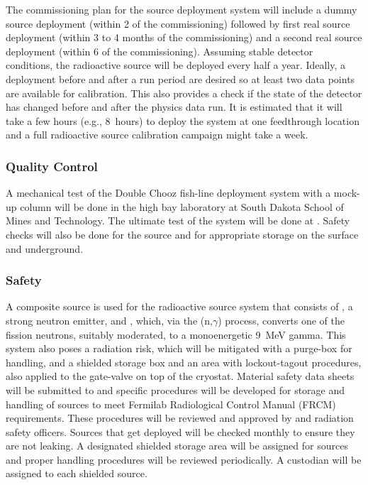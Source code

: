 The commissioning plan for the source deployment system will include a dummy source deployment (within \num{2} of the commissioning) followed by first real source deployment (within \num{3} to \num{4} months of the commissioning) and a second real source deployment (within \num{6} of the commissioning). Assuming stable detector conditions, the radioactive source will be deployed every half a year. Ideally, a deployment before and after a run period are desired so at least two data points are available for calibration. This also provides a check if the state of the detector
has changed before and after the physics data run.
It is estimated that it will take a few hours (e.g., \num{8}~hours) to deploy the system at one feedthrough location and a full radioactive source calibration campaign might take %
a week.

\subsubsection{Quality Control}
A mechanical test of the Double Chooz fish-line deployment system with a  mock-up column will be done in the high bay laboratory at South Dakota School of Mines and Technology. The ultimate test of the system will be done at . Safety checks will also be done for the source and for appropriate storage on the surface and underground. 

\subsubsection{Safety}
\label{sec:dp-calib-rsds-safety}
A composite source is used for the radioactive source system that consists  of , a strong neutron emitter, and , which, via the (n,$\gamma$) process, converts one of the  fission neutrons, suitably moderated, to a monoenergetic \SI{9}{\MeV} gamma. This system also poses a radiation risk, which will be mitigated with a purge-box for handling, and a shielded storage box and an area with lockout-tagout procedures, also applied to the gate-valve on top of the cryostat. Material safety data sheets will be submitted to   and specific procedures will be developed for storage and handling of sources to meet Fermilab Radiological Control Manual (FRCM) requirements. These procedures will be reviewed and approved by  and \fnal radiation safety officers. Sources that get deployed will be checked monthly to ensure they are not leaking. A designated shielded storage area will be assigned for sources and proper handling procedures will be reviewed periodically. A custodian will be assigned to each shielded source.